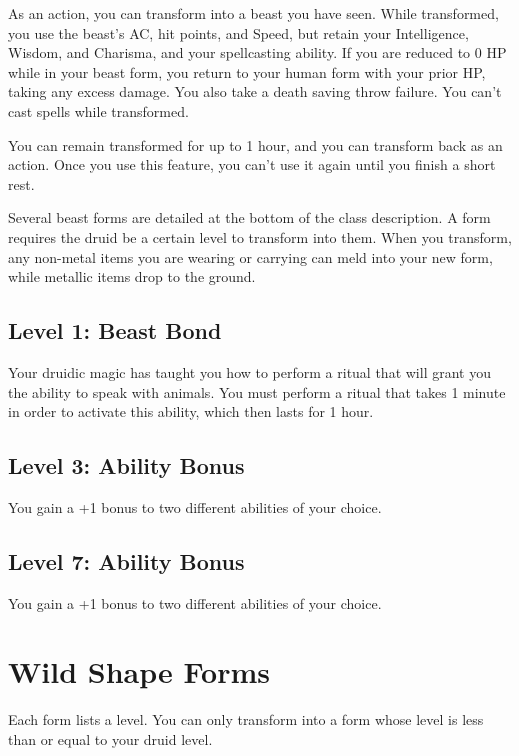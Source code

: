 \documentclass[12pt,letterpaper,twocolumn,openany,nodeprecatedcode,bg=none]{dndbook}
\let\oldsubsection\subsection
\renewcommand{\subsection}[1]{%
  \needspace{5\baselineskip}%
  \oldsubsection{#1}%
}
\begin{document}
As an action, you can transform into a beast you have seen. While
transformed, you use the beast's AC, hit points, and Speed, but retain
your Intelligence, Wisdom, and Charisma, and your spellcasting ability.
If you are reduced to 0 HP while in your beast form, you return to your
human form with your prior HP, taking any excess damage. You also take a
death saving throw failure. You can't cast spells while transformed.

You can remain transformed for up to 1 hour, and you can transform back
as an action. Once you use this feature, you can't use it again until
you finish a short rest.

Several beast forms are detailed at the bottom of the class description.
A form requires the druid be a certain level to transform into them.
When you transform, any non-metal items you are wearing or carrying can
meld into your new form, while metallic items drop to the ground.

\subsection{Level 1: Beast Bond}\label{level-1-beast-bond}

Your druidic magic has taught you how to perform a ritual that will
grant you the ability to speak with animals. You must perform a ritual
that takes 1 minute in order to activate this ability, which then lasts
for 1 hour.

\subsection{Level 3: Ability Bonus}\label{level-3-ability-bonus}

You gain a +1 bonus to two different abilities of your choice.

\subsection{Level 7: Ability Bonus}\label{level-7-ability-bonus}

You gain a +1 bonus to two different abilities of your choice.

\newpage

\section{Wild Shape Forms}\label{wild-shape-forms}

Each form lists a level. You can only transform into a form whose level
is less than or equal to your druid level.
\end{document}
